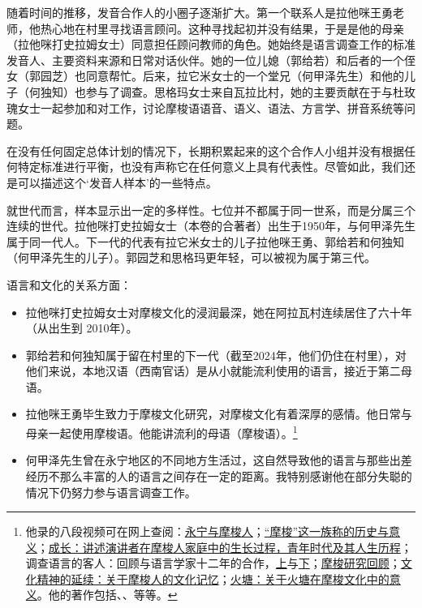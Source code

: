 随着时间的推移，发音合作人的小圈子逐渐扩大。第一个联系人是拉他咪王勇老师，他热心地在村里寻找语言顾问。这种寻找起初并没有结果，于是是他的母亲（拉他咪打史拉姆女士）同意担任顾问教师的角色。她始终是语言调查工作的标准发音人、主要资料来源和日常对话伙伴。她的一位儿媳（郭给若）和后者的一个侄女（郭园芝）也同意帮忙。后来，拉它米女士的一个堂兄（何甲泽先生）和他的儿子（何独知）也参与了调查。思格玛女士来自瓦拉比村，她的主要贡献在于与杜玫瑰女士一起参加和对工作，讨论摩梭语语音、语义、语法、方言学、拼音系统等问题。

在没有任何固定总体计划的情况下，长期积累起来的这个合作人小组并没有根据任何特定标准进行平衡，也没有声称它在任何意义上具有代表性。尽管如此，我们还是可以描述这个‘发音人样本’的一些特点。

就世代而言，样本显示出一定的多样性。七位并不都属于同一世系，而是分属三个连续的世代。拉他咪打史拉姆女士（本卷的合著者）出生于1950年，与何甲泽先生属于同一代人。下一代的代表有拉它米女士的儿子拉他咪王勇、郭给若和何独知（何甲泽先生的儿子）。郭园芝和思格玛更年轻，可以被视为属于第三代。

语言和文化的关系方面：

\begin{itemize}
    \item 拉他咪打史拉姆女士对摩梭文化的浸润最深，她在阿拉瓦村连续居住了六十年（从出生到 2010年）。
    \item 郭给若和何独知属于留在村里的下一代（截至2024年，他们仍住在村里），对他们来说，本地汉语（西南官话）是从小就能流利使用的语言，接近于第二母语。
    \item 拉他咪王勇毕生致力于摩梭文化研究，对摩梭文化有着深厚的感情。他日常与母亲一起使用摩梭语。他能讲流利的母语（摩梭语）。\footnote{他录的八段视频可在网上查阅：\href{https://doi.org/10.24397/pangloss-0007734}{永宁与摩梭人}；\href{https://doi.org/10.24397/pangloss-0007740}{“摩梭”这一族称的历史与意义}；\href{https://doi.org/10.24397/pangloss-0007730}{成长：讲述演讲者在摩梭人家庭中的生长过程，青年时代及其人生历程}；调查语言的客人：回顾与语言学家十二年的合作，\href{https://doi.org/10.24397/pangloss-0007736}{上}与\href{https://doi.org/10. 24397/pangloss-0007738}{下}；\href{https://doi.org/10.24397/pangloss-0007742}{摩梭研究回顾}；\href{https://doi.org/10.24397/pangloss-0007728}{文化精神的延续：关于摩梭人的文化记忆}；\href{https://doi.org/10.24397/pangloss-0007732}{火塘：关于火塘在摩梭文化中的意义}。他的著作包括\textcite{latami2006}、\textcite{latami2009}、\textcite{latami2016}等等。} %
    \item 何甲泽先生曾在永宁地区的不同地方生活过，这自然导致他的语言与那些出差经历不那么丰富的人的语言之间存在一定的距离。我特别感谢他在部分失聪的情况下仍努力参与语言调查工作。
\end{itemize}

